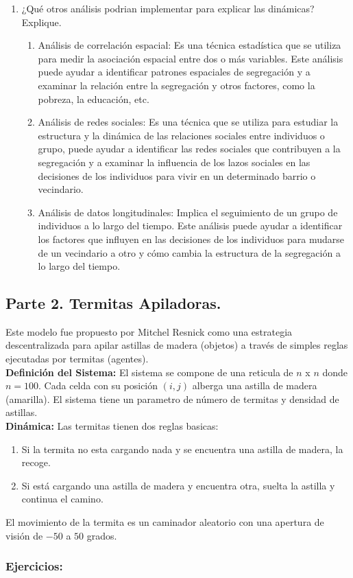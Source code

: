 \documentclass[12pt]{article}
\begin{document}
\begin{enumerate}
    \item ¿Qué otros análisis podrian implementar para explicar las dinámicas? Explique.\\
    \begin{enumerate}
        \item Análisis de correlación espacial: Es una técnica estadística que se utiliza para medir la asociación espacial entre dos o más variables. Este análisis puede ayudar a identificar patrones espaciales de segregación y a examinar la relación entre la segregación y otros factores, como la pobreza, la educación, etc.
        \item Análisis de redes sociales: Es una técnica que se utiliza para estudiar la estructura y la dinámica de las relaciones sociales entre individuos o grupo, puede ayudar a identificar las redes sociales que contribuyen a la segregación y a examinar la influencia de los lazos sociales en las decisiones de los individuos para vivir en un determinado barrio o vecindario.
        \item Análisis de datos longitudinales: Implica el seguimiento de un grupo de individuos a lo largo del tiempo. Este análisis puede ayudar a identificar los factores que influyen en las decisiones de los individuos para mudarse de un vecindario a otro y cómo cambia la estructura de la segregación a lo largo del tiempo.
    \end{enumerate}
\end{enumerate}

{\color{blue} \subsection*{Parte 2. Termitas Apiladoras.}}
\vspace{1em}

Este modelo fue propuesto por Mitchel Resnick como una estrategia descentralizada para apilar astillas de madera (objetos) a través de simples reglas ejecutadas por termitas (agentes).\\

\textbf{Definición del Sistema:} El sistema se compone de una reticula de $n$ x $n$ donde $n=100$. Cada celda con su posición $(i,j)$ alberga una astilla de madera (amarilla). El sistema tiene un parametro de número de termitas y densidad de astillas.\\

\textbf{Dinámica:} Las termitas tienen dos reglas basicas:\\
\begin{enumerate}
    \item Si la termita no esta cargando nada y se encuentra una astilla de madera, la recoge.
    \item Si está cargando una astilla de madera y encuentra otra, suelta la astilla y continua el camino.
\end{enumerate}
El movimiento  de la termita es un caminador aleatorio con una apertura de visión de $-50$ a $50$ grados.\\ 
{\color{blue} \subsubsection*{Ejercicios:}}
\end{document}
